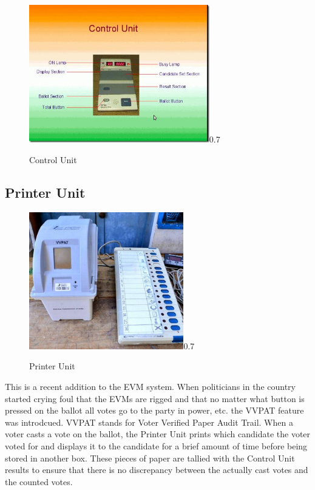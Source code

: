 \documentclass[a4paper,11pt]{article}
\begin{document}
\begin{figure}[h!]
  \centering
  \begin{annotate}{\includegraphics[width=0.7\textwidth]{evm-control-thumb1.jpg}}{0.7}
  \end{annotate}
  \caption{Control Unit\protect\footnotemark}\label{fig:Airbus}
\end{figure}


\subsection{Printer Unit}

\begin{figure}[h!]
  \centering
  \begin{annotate}{\includegraphics[width=0.6\textwidth]{vvpat.jpeg}}{0.7}
  \end{annotate}
  \caption{Printer Unit\protect\footnotemark}\label{fig:Airbus}
\end{figure}


This is a recent addition to the EVM system. When politicians in the country started crying foul that the EVMs are rigged and that no matter what button is pressed on the ballot all votes go to the party in power, etc. the VVPAT feature was introdcued. VVPAT stands for Voter Verified Paper Audit Trail. When a voter casts a vote on the ballot, the Printer Unit prints which candidate the voter voted for and displays it to the candidate for a brief amount of time before being stored in another box. These pieces of paper are tallied with the Control Unit results to ensure that there is no discrepancy between the actually cast votes and the counted votes. 
\end{document}
